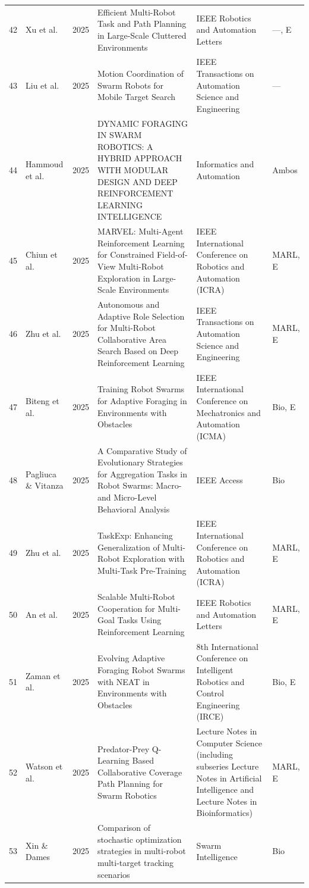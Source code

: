 \begin{longtable}{@{}r>{\raggedright\arraybackslash}p{2.3cm}r>{\raggedright\arraybackslash}p{5.4cm}>{\raggedright\arraybackslash}p{3.0cm}p{1.4cm}@{}}
42 & Xu et al. & 2025 & Efficient Multi-Robot Task and Path Planning in Large-Scale Cluttered Environments & IEEE Robotics and Automation Letters & ---, E \\
43 & Liu et al. & 2025 & Motion Coordination of Swarm Robots for Mobile Target Search & IEEE Transactions on Automation Science and Engineering & --- \\
44 & Hammoud et al. & 2025 & DYNAMIC FORAGING IN SWARM ROBOTICS: A HYBRID APPROACH WITH MODULAR DESIGN AND DEEP REINFORCEMENT LEARNING INTELLIGENCE & Informatics and Automation & Ambos \\
45 & Chiun et al. & 2025 & MARVEL: Multi-Agent Reinforcement Learning for Constrained Field-of-View Multi-Robot Exploration in Large-Scale Environments & 2025 IEEE International Conference on Robotics and Automation (ICRA) & MARL, E \\
46 & Zhu et al. & 2025 & Autonomous and Adaptive Role Selection for Multi-Robot Collaborative Area Search Based on Deep Reinforcement Learning & IEEE Transactions on Automation Science and Engineering & MARL, E \\
47 & Biteng et al. & 2025 & Training Robot Swarms for Adaptive Foraging in Environments with Obstacles & 2025 IEEE International Conference on Mechatronics and Automation (ICMA) & Bio, E \\
48 & Pagliuca \& Vitanza & 2025 & A Comparative Study of Evolutionary Strategies for Aggregation Tasks in Robot Swarms: Macro- and Micro-Level Behavioral Analysis & IEEE Access & Bio \\
49 & Zhu et al. & 2025 & TaskExp: Enhancing Generalization of Multi-Robot Exploration with Multi-Task Pre-Training & 2025 IEEE International Conference on Robotics and Automation (ICRA) & MARL, E \\
50 & An et al. & 2025 & Scalable Multi-Robot Cooperation for Multi-Goal Tasks Using Reinforcement Learning & IEEE Robotics and Automation Letters & MARL, E \\
51 & Zaman et al. & 2025 & Evolving Adaptive Foraging Robot Swarms with NEAT in Environments with Obstacles & 2025 8th International Conference on Intelligent Robotics and Control Engineering (IRCE) & Bio, E \\
52 & Watson et al. & 2025 & Predator-Prey Q-Learning Based Collaborative Coverage Path Planning for Swarm Robotics & Lecture Notes in Computer Science (including subseries Lecture Notes in Artificial Intelligence and Lecture Notes in Bioinformatics) & MARL, E \\
53 & Xin \& Dames & 2025 & Comparison of stochastic optimization strategies in multi-robot multi-target tracking scenarios & Swarm Intelligence & Bio \\

\end{longtable}
